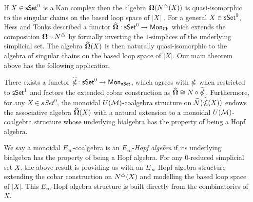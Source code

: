 If $X \in \mathsf{sSet}^0$ is a Kan complex then the algebra $\mathbf{\Omega}(N^{\triangle}(X))$ is quasi-isomorphic to the singular chains on the based loop space of $|X|$ \cite{Rivera-Zeinalian}. For a general $X \in \mathsf{sSet}^0$, Hess and Tonks described a functor $\widehat{\mathbf{\Omega}}: \mathsf{sSet}^0 \to \mathsf{Mon}_{\mathsf{Ch}}$ which extends the composition $\mathbf{\Omega} \circ N^{\triangle}$ by formally inverting the $1$-simplices of the underlying simplicial set. The algebra $\widehat{\mathbf{\Omega}}(X)$ is then naturally quasi-isomorphic to the algebra of singular chains on the based loop space of $|X|$. Our main theorem above has the following application. 


\begin{theorem}
There exists a functor $\widehat{\mathbb{\Omega}} \colon \mathsf{sSet}^0 \to \mathsf{Mon}_{\mathsf{nSet}}$, which agrees with $\mathbb{\Omega}$ when restricted to $\mathsf{sSet}^1$ and factors the extended cobar construction as $\widehat{\mathbf{\Omega}} \cong N \circ \widehat{\mathbb{\Omega}}$. Furthermore, for any $X \in sSet^0$, the monoidal $U(\mathcal{M})$-coalgebra structure on $\widetilde{\mathcal{N}}(\widehat{\mathbb{\Omega}}(X))$ endows the associative algebra $\widehat{\mathbf{\Omega}}(X)$ with a natural extension to a monoidal $U(\mathcal{M})$-coalgebra structure whose underlying bialgebra has the property of being a Hopf algebra.
\end{theorem}

We say a monoidal $E_{\infty}$-coalgebra is an $E_{\infty}$-\textit{Hopf algebra} if its underlying bialgebra has the property of being a Hopf algebra. For any $0$-reduced simplicial set $X$, the above result is providing us with an $E_{\infty}$-Hopf algebra structure extending the cobar construction on $N^{\triangle}(X)$ and modelling the based loop space of $|X|$. This $E_{\infty}$-Hopf algebra structure is built directly from the combinatorics of $X$. 


